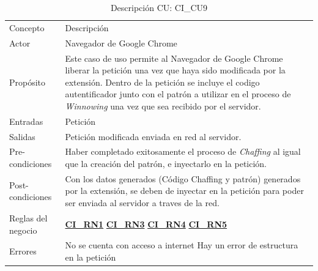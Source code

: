 \documentclass[12pt, a4paper, titlepage]{report}
\begin{document}
				\begin{table}[H]
    				\begin{tabular}{ |p{3.5cm}||p{9.5cm}|}
    					\hline
    					\rowcolor{guindapoli}
    					\multicolumn{2}{|c|}{\textbf{\textcolor{white}{Caso de uso: CI\_CU9. Liberación de Petición.}}}\\
    					\hline
    					\rowcolor{azulfuerte}Concepto & Descripción\\
    					\hline
    					\cellcolor{azulclaro}Actor & 
    					Navegador de Google Chrome\\ 
    					\hline
    					\cellcolor{azulclaro}Propósito &
    					Este caso de uso permite al Navegador de Google Chrome liberar la petición una vez que haya sido modificada por la extensión. Dentro de la petición se incluye el codigo autentificador junto con el patrón a utilizar en el proceso de \textit{Winnowing} una vez que sea recibido por el servidor.\\
    					\hline
    					\cellcolor{azulclaro}Entradas &
    					Petición\\
    					\hline
    					\cellcolor{azulclaro}Salidas &
    					Petición modificada enviada en red al servidor.\\
    					\hline
    					\cellcolor{azulclaro}Pre-condiciones&
    					Haber completado exitosamente el proceso de \textit{Chaffing} al igual que la creación del patrón, e inyectarlo en la petición.\\
    					\hline
    					\cellcolor{azulclaro}Post-condiciones&
    					Con los datos generados (Código Chaffing y patrón) generados por la extensión, se deben de inyectar en la petición para poder ser enviada al servidor a traves de la red.\\
    					\hline
    					\cellcolor{azulclaro}Reglas del negocio&
    					\hyperref[CI_RN1]{\textbf{CI\_RN1}} \newline \hyperref[CI_RN3]{\textbf{CI\_RN3}} \newline
    					\hyperref[CI_RN4]{\textbf{CI\_RN4}} \newline
    					\hyperref[CI_RN5]{\textbf{CI\_RN5}} \\
    					\hline
    					\cellcolor{azulclaro}Errores &
    					No se cuenta con acceso a internet \newline
    					Hay un error de estructura en la petición \\		
    					\hline
    				\end{tabular}
				\caption[DCU: CI\_CU9]{Descripción CU: CI\_CU9}
				\end{table}
				
\end{document}

